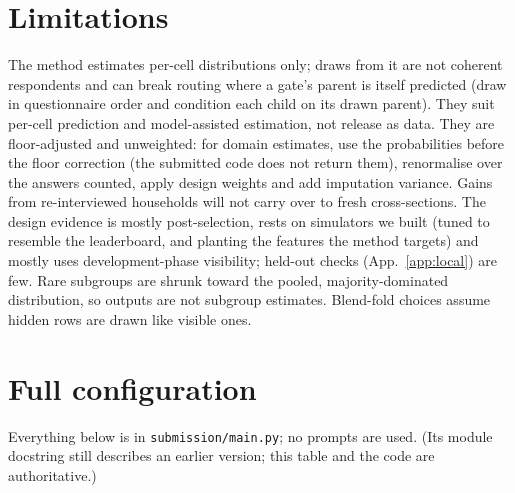 \documentclass{article}
\begin{document}
\section{Limitations}
\label{sec:limitations}

The method estimates per-cell distributions only; draws from it are not coherent respondents and can break routing where a gate's parent is itself predicted (draw in questionnaire order and condition each child on its drawn parent). They suit per-cell prediction and model-assisted estimation, not release as data. They are floor-adjusted and unweighted: for domain estimates, use the probabilities before the floor correction (the submitted code does not return them), renormalise over the answers counted, apply design weights and add imputation variance. Gains from re-interviewed households will not carry over to fresh cross-sections. The design evidence is mostly post-selection, rests on simulators we built (tuned to resemble the leaderboard, and planting the features the method targets) and mostly uses development-phase visibility; held-out checks (App.~\ref{app:local}) are few. Rare subgroups are shrunk toward the pooled, majority-dominated distribution, so outputs are not subgroup estimates. Blend-fold choices assume hidden rows are drawn like visible ones.




\clearpage
\appendix

\section{Full configuration}
Everything below is in \texttt{submission/main.py}; no prompts are used. (Its module docstring still describes an earlier version; this table and the code are authoritative.)
\end{document}
